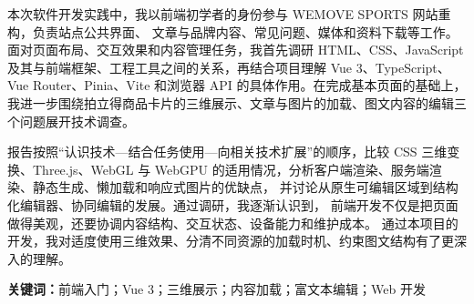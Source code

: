 本次软件开发实践中，我以前端初学者的身份参与 WEMOVE SPORTS 网站重构，负责站点公共界面、%
文章与品牌内容、常见问题、媒体和资料下载等工作。面对页面布局、交互效果和内容管理任务，我首先调研
HTML、CSS、JavaScript 及其与前端框架、工程工具之间的关系，再结合项目理解 Vue 3、TypeScript、Vue
Router、Pinia、Vite 和浏览器 API 的具体作用。在完成基本页面的基础上，%
我进一步围绕拍立得商品卡片的三维展示、文章与图片的加载、图文内容的编辑三个问题展开技术调查。

报告按照“认识技术—结合任务使用—向相关技术扩展”的顺序，比较 CSS 三维变换、Three.js、WebGL 与 WebGPU
的适用情况，分析客户端渲染、服务端渲染、静态生成、懒加载和响应式图片的优缺点，%
并讨论从原生可编辑区域到结构化编辑器、协同编辑的发展。通过调研，我逐渐认识到，%
前端开发不仅是把页面做得美观，还要协调内容结构、交互状态、设备能力和维护成本。%
通过本项目的开发，我对适度使用三维效果、分清不同资源的加载时机、约束图文结构有了更深入的理解。
\vspace{1.5cm}

\noindent\textbf{关键词：}前端入门；Vue 3；三维展示；内容加载；富文本编辑；Web 开发


